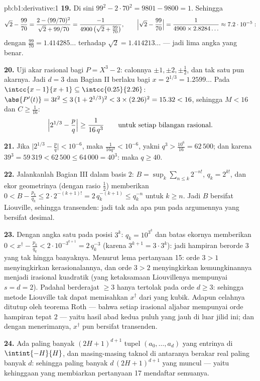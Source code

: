 \begin{solution}{pb:b1:derivative:1}
\textbf{19.} Di sini $99^2 - 2\cdot70^2 = 9801 - 9800 = 1$. Sehingga
\[
\sqrt2 - \frac{99}{70} =
\frac{2 - (99/70)^2}{\sqrt2 + 99/70}
= \frac{-1}{4900\,\bigl(\sqrt2 + \tfrac{99}{70}\bigr)} ,
\qquad
\Bigl|\sqrt2 - \frac{99}{70}\Bigr|
= \frac{1}{4900 \times 2.8284\dots} \approx 7.2\cdot10^{-5} :
\]
dengan $\frac{99}{70} = 1.414285\dots$ terhadap $\sqrt2 =
1.414213\dots$ --- jadi lima angka yang benar.

\textbf{20.} Uji akar rasional bagi $P = X^3 - 2$: calonnya
$\pm1, \pm2, \pm\frac12$, dan tak satu pun akarnya. Jadi $d = 3$ dan Bagian II
berlaku bagi $x = 2^{1/3} = 1.2599\dots$ Pada $\intcc{x - 1}{x + 1}
\subseteq \intcc{0.25}{2.26}$: $\abs{P'(t)} = 3t^2 \leq 3\,(1 +
2^{1/3})^2 < 3\times(2.26)^2 = 15.32 < 16$, sehingga $M < 16$ dan $C
\geq \frac{1}{16}$:
\[
\Bigl|2^{1/3} - \frac pq\Bigr| \geq \frac{1}{16\,q^3}
\qquad\text{untuk setiap bilangan rasional.}
\]

\textbf{21.} Jika $\bigl|2^{1/3} - \frac pq\bigr| < 10^{-6}$, maka
$\frac{1}{16 q^3} < 10^{-6}$, yakni $q^3 > \frac{10^6}{16} =
62\,500$; dan karena $39^3 = 59\,319 < 62\,500 \leq 64\,000 = 40^3$:
maka $q \geq 40$.

\textbf{22.} Jalankanlah Bagian III dalam basis $2$: $B = \sup_k \sum_{n\leq
k} 2^{-n!}$, $q_k = 2^{k!}$, dan ekor geometrinya (dengan rasio
$\frac12$) memberikan $0 < B - \frac{p_k}{q_k} \leq 2\cdot2^{-(k+1)!}
= 2\,q_k^{-(k+1)} \leq q_k^{-n}$ untuk $k \geq n$. Jadi $B$ bersifat
Liouville, sehingga transenden: jadi tak ada apa pun pada argumennya yang
bersifat desimal.

\textbf{23.} Dengan angka satu pada posisi $3^k$: $q_k = 10^{3^k}$ dan
batas ekornya memberikan $0 < x^\dagger - \frac{p_k}{q_k} <
2\cdot10^{-3^{k+1}} = 2\,q_k^{-3}$ (karena $3^{k+1} = 3\cdot3^k$):
jadi hampiran berorde $3$ yang tak hingga banyaknya. Menurut lema
pertanyaan 15: orde $3 > 1$ menyingkirkan kerasionalannya, dan orde $3 >
2$ menyingkirkan kemungkinannya menjadi irasional kuadratik (yang ketaksamaan
Liouvillenya mempunyai $s = d = 2$). Padahal  berderajat
$\geq 3$ hanya tertolak pada orde $d \geq 3$: sehingga metode
Liouville tak dapat memisahkan $x^\dagger$ dari yang kubik. Adapun celahnya
ditutup oleh teorema Roth --- bahwa setiap irasional aljabar mempunyai
orde hampiran tepat $2$ --- yaitu hasil abad kedua puluh yang
jauh di luar jilid ini; dan dengan menerimanya, $x^\dagger$ pun
bersifat transenden.

\textbf{24.} Ada paling banyak $(2H+1)^{d+1}$ tupel $(a_0,
\dots, a_d)$ yang entrinya di $\intint{-H}{H}$, dan masing-masing
 taknol di antaranya berakar real paling banyak $d$: sehingga paling banyak
$d\,(2H+1)^{d+1}$  yang muncul --- yaitu kehinggaan
yang membiarkan pertanyaan 17 mendaftar semuanya.


\end{solution}
